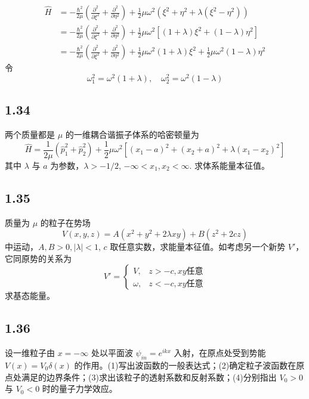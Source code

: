 \begin{equation}
    \begin{aligned}
        \hat{H}&=-\frac{\hbar ^2}{2\mu}\left( \frac{\partial ^2}{\partial \xi ^2}+\frac{\partial ^2}{\partial \eta ^2} \right) +\frac{1}{2}\mu \omega ^2\left( \xi ^2+\eta ^2+\lambda \left( \xi ^2-\eta ^2 \right) \right) 
\\
&=-\frac{\hbar ^2}{2\mu}\left( \frac{\partial ^2}{\partial \xi ^2}+\frac{\partial ^2}{\partial \eta ^2} \right) +\frac{1}{2}\mu \omega ^2\left[ \left( 1+\lambda \right) \xi ^2+\left( 1-\lambda \right) \eta ^2 \right] 
\\
&=-\frac{\hbar ^2}{2\mu}\left( \frac{\partial ^2}{\partial \xi ^2}+\frac{\partial ^2}{\partial \eta ^2} \right) +\frac{1}{2}\mu \omega ^2\left( 1+\lambda \right) \xi ^2+\frac{1}{2}\mu \omega ^2\left( 1-\lambda \right) \eta ^2
    \end{aligned}
\end{equation}
令
\begin{equation}
    \omega _{1}^{2}=\omega ^2\left( 1+\lambda \right) ,\quad \omega _{2}^{2}=\omega ^2\left( 1-\lambda \right) 
\end{equation}


\subsection{1.34}
两个质量都是 $\mu$ 的一维耦合谐振子体系的哈密顿量为
$$\hat{H} = \frac{1}{2\mu} (\hat{p}_1^2 + \hat{p}_2^2) + \frac{1}{2} \mu \omega^2 [(x_1 - a)^2 + (x_2 + a)^2 + \lambda (x_1 - x_2)^2]$$
其中 $\lambda$ 与 $a$ 为参数，$\lambda > -1/2$, $- \infty < x_1, x_2 < \infty$. 求体系能量本征值。

\subsection{1.35}
质量为 $\mu$ 的粒子在势场
$$V(x, y, z) = A(x^2+y^2+2\lambda xy)+B(z^2+2cz)$$
中运动，$A, B > 0, |\lambda| < 1$, $c$ 取任意实数，求能量本征值。如考虑另一个新势 $V'$，它同原势的关系为
$$V' = 
\begin{cases}
V, & z > -c, xy \text{任意}\\
\omega, & z < -c, xy \text{任意}
\end{cases}$$
求基态能量。

\subsection{1.36}
设一维粒子由 $x = -\infty$ 处以平面波 $\psi_{in} = e^{ikx}$ 入射，在原点处受到势能 $V(x) = V_0 \delta (x)$ 的作用。(1)写出波函数的一般表达式；(2)确定粒子波函数在原点处满足的边界条件；(3)求出该粒子的透射系数和反射系数；(4)分别指出 $V_0 > 0$ 与 $V_0 < 0$ 时的量子力学效应。

